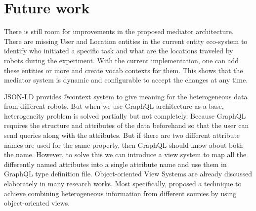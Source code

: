 \section{Future work}
There is still room for improvements in the proposed mediator architecture. 
There are missing User and Location entities in the current entity eco-system to identify who initiated a specific task and what are the locations traveled by robots during the experiment.  With the current implementation, one can add these entities or more and create vocab contexts for them. This shows that the mediator system is dynamic and configurable to accept the changes at any time.

JSON-LD provides @context system to give meaning for the heterogeneous data from different robots. But when we use GraphQL architecture as a base, heterogeneity problem is solved partially but not completely. Because GraphQL requires the structure and attributes of the data beforehand so that the user can send queries along with the attributes. But if there are two different attribute names are used for the same property, then GraphQL should know about both the name. However, to solve this we can introduce a view system to map all the differently named attributes into a single attribute name and use them in GraphQL type definition file. Object-oriented View Systems are already discussed elaborately in many research works. Most specifically, \citet{kaul1990viewsystem} proposed a technique to achieve combining heterogeneous information from different sources by using object-oriented views.


